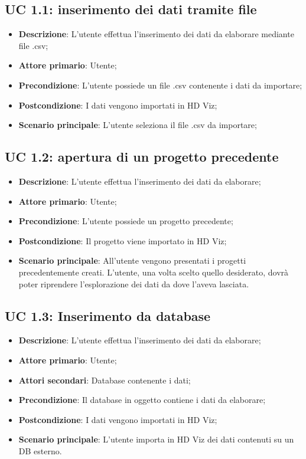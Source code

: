 \subsection{UC 1.1: inserimento dei dati tramite file}
\begin{itemize}
    \item{\textbf{Descrizione}}: L'utente effettua l'inserimento dei dati da elaborare mediante file .csv;
    \item{\textbf{Attore primario}}: Utente;
    \item{\textbf{Precondizione}}: L'utente possiede un file .csv contenente i dati da importare;
    \item{\textbf{Postcondizione}}: I dati vengono importati in HD Viz;
    \item{\textbf{Scenario principale}}: L'utente seleziona il file .csv da importare;
\end{itemize}

\subsection{UC 1.2: apertura di un progetto precedente}
\begin{itemize}
    \item{\textbf{Descrizione}}: L'utente effettua l'inserimento dei dati da elaborare;
    \item{\textbf{Attore primario}}: Utente;
    \item{\textbf{Precondizione}}: L'utente possiede un progetto precedente;
    \item{\textbf{Postcondizione}}: Il progetto viene importato in HD Viz;
    \item{\textbf{Scenario principale}}: All'utente vengono presentati i progetti precedentemente creati. L'utente, una volta scelto quello desiderato, dovrà poter riprendere l'esplorazione dei dati da dove l'aveva lasciata.
\end{itemize}

\subsection{UC 1.3: Inserimento da database}
\begin{itemize}
    \item{\textbf{Descrizione}}: L'utente effettua l'inserimento dei dati da elaborare;
    \item{\textbf{Attore primario}}: Utente;
    \item{\textbf{Attori secondari}}: Database contenente i dati;
    \item{\textbf{Precondizione}}: Il database in oggetto contiene i dati da elaborare;
    \item{\textbf{Postcondizione}}: I dati vengono importati in HD Viz;
    \item{\textbf{Scenario principale}}: L'utente importa in HD Viz dei dati contenuti su un DB esterno.
\end{itemize}
